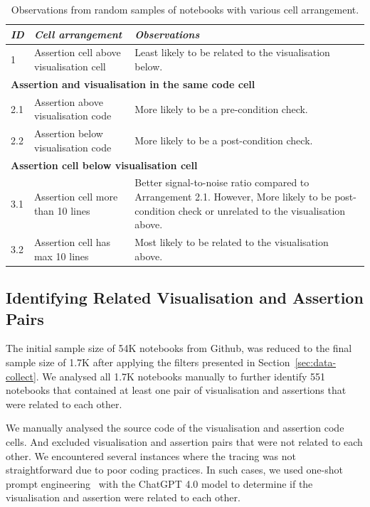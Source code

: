 \documentclass[conference]{IEEEtran}
\begin{document}
\begin{table}
  \centering
  \caption{Observations from random samples of notebooks with various
  cell arrangement.}
  \begin{tabular}{l p{} p{}}
    \hline
    \emph{\textbf{ID}}&
    \emph{\textbf{Cell arrangement}} &
    \emph{\textbf{Observations}}\\
    \hline
    1 &
    Assertion cell above visualisation cell &
    Least likely to be related to the visualisation below.\\
    \hline
    \multicolumn{3}{l}{\textbf{Assertion and visualisation in the same code cell}}\\
    \hline
    2.1 &
    Assertion above visualisation code &
    More likely to be a pre-condition check.\\
    2.2 &
    Assertion below visualisation code &
    More likely to be a post-condition check.\\
    \hline
    \multicolumn{3}{l}{\textbf{Assertion cell below visualisation cell}}\\
    \hline
    3.1 &
    Assertion cell more than 10 lines &
    Better signal-to-noise ratio compared to Arrangement 2.1. However, More likely to be post-condition check or unrelated to the visualisation above.\\
    3.2 &
    Assertion cell has max 10 lines &
    Most likely to be related to the visualisation above.\\
    \hline
  \end{tabular}
  \label{tab:cell-arrangement}
\end{table}

\subsection{Identifying Related Visualisation and Assertion Pairs}\label{sec:identify-related-pairs}

The initial sample size of 54K notebooks from Github, was reduced to the final sample size of 1.7K after applying the filters presented in Section~\ref{sec:data-collect}. We analysed all 1.7K notebooks manually to further identify 551 notebooks that contained at least one pair of visualisation and assertions that were related to each other.

We manually analysed the source code of the visualisation and assertion code cells. And excluded visualisation and assertion pairs that were not related to each other. We encountered several instances where the tracing was not straightforward due to poor coding practices. In such cases, we used one-shot prompt engineering~\cite{CITME} with the ChatGPT 4.0 model to determine if the visualisation and assertion were related to each other.
\end{document}
